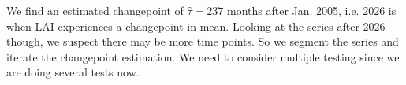 \documentclass[12pt]{article}
\newcommand{\ed}{\end{document}}
\begin{document}
We find an estimated changepoint of $\hat{\tau}= 237$ months after Jan. 2005, i.e. 2026 is when LAI experiences a changepoint in mean. Looking at the series after 2026 though, we suspect there may be more time points. So we segment the series and iterate the changepoint estimation. We need to consider multiple testing since we are doing several tests now.



\ed
\end{document}
